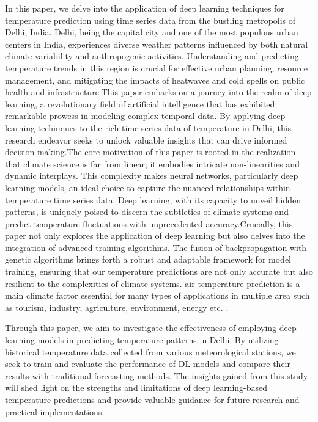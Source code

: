 \documentclass[sn-mathphys,Numbered]{sn-jnl}
\theoremstyle{thmstyleone}
\theoremstyle{thmstyletwo}
\theoremstyle{thmstylethree}
\begin{document}
In this paper, we delve into the application of deep learning techniques for temperature prediction using time series data from the bustling metropolis of Delhi, India. Delhi, being the capital city and one of the most populous urban centers in India, experiences diverse weather patterns influenced by both natural climate variability and anthropogenic activities. Understanding and predicting temperature trends in this region is crucial for effective urban planning, resource management, and mitigating the impacts of heatwaves and cold spells on public health and infrastructure.This paper embarks on a journey into the realm of deep learning, a revolutionary field of artificial intelligence that has exhibited remarkable prowess in modeling complex temporal data. By applying deep learning techniques to the rich time series data of temperature in Delhi, this research endeavor seeks to unlock valuable insights that can drive informed decision-making.The core motivation of this paper is rooted in the realization that climate science is far from linear; it embodies intricate non-linearities and dynamic interplays. This complexity makes neural networks, particularly deep learning models, an ideal choice to capture the nuanced relationships within temperature time series data. Deep learning, with its capacity to unveil hidden patterns, is uniquely poised to discern the subtleties of climate systems and predict temperature fluctuations with unprecedented accuracy.Crucially, this paper not only explores the application of deep learning but also delves into the integration of advanced training algorithms. The fusion of backpropagation with genetic algorithms brings forth a robust and adaptable framework for model training, ensuring that our temperature predictions are not only accurate but also resilient to the complexities of climate systems. air temperature prediction is a main climate factor essential for many types of applications in multiple area such as tourism,  industry, agriculture,  environment,  energy etc. \cite{abdel2004hourly}.

Through this paper, we aim to investigate the effectiveness of employing deep learning models in predicting temperature patterns in Delhi. By utilizing historical temperature data collected from various meteorological stations, we seek to train and evaluate the performance of DL models and compare their results with traditional forecasting methods. The insights gained from this study will shed light on the strengths and limitations of deep learning-based temperature predictions and provide valuable guidance for future research and practical implementations.
\end{document}
